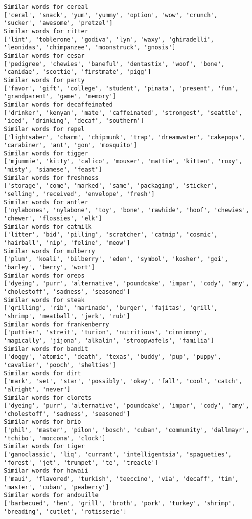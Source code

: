 \documentclass[11pt]{article}
\begin{document}
\begin{Verbatim}[commandchars=\\\{\}]
Similar words for cereal
['ceral', 'snack', 'yum', 'yummy', 'option', 'wow', 'crunch', 'sucker', 'awesome', 'pretzel']
Similar words for ritter
['lint', 'toblerone', 'godiva', 'lyn', 'waxy', 'ghiradelli', 'leonidas', 'chimpanzee', 'moonstruck', 'gnosis']
Similar words for cesar
['pedigree', 'chewies', 'baneful', 'dentastix', 'woof', 'bone', 'canidae', 'scottie', 'firstmate', 'pigg']
Similar words for party
['favor', 'gift', 'college', 'student', 'pinata', 'present', 'fun', 'grandparent', 'game', 'memory']
Similar words for decaffeinated
['drinker', 'kenyan', 'mate', 'caffeinated', 'strongest', 'seattle', 'iced', 'drinking', 'decaf', 'southern']
Similar words for repel
['lightsaber', 'charm', 'chipmunk', 'trap', 'dreamwater', 'cakepops', 'carabiner', 'ant', 'gon', 'mosquito']
Similar words for tigger
['mjummie', 'kitty', 'calico', 'mouser', 'mattie', 'kitten', 'roxy', 'misty', 'siamese', 'feast']
Similar words for freshness
['storage', 'come', 'marked', 'same', 'packaging', 'sticker', 'selling', 'received', 'envelope', 'fresh']
Similar words for antler
['nylabones', 'nylabone', 'toy', 'bone', 'rawhide', 'hoof', 'chewies', 'chewer', 'flossies', 'elk']
Similar words for catmilk
['litter', 'bid', 'pilling', 'scratcher', 'catnip', 'cosmic', 'hairball', 'nip', 'feline', 'meow']
Similar words for mulberry
['plum', 'koali', 'bilberry', 'eden', 'symbol', 'kosher', 'goi', 'barley', 'berry', 'wort']
Similar words for oreos
['dyeing', 'purr', 'alternative', 'poundcake', 'impar', 'cody', 'amy', 'cholestoff', 'sadness', 'seasoned']
Similar words for steak
['grilling', 'rib', 'marinade', 'burger', 'fajitas', 'grill', 'shrimp', 'meatball', 'jerk', 'rub']
Similar words for frankenberry
['puttier', 'streit', 'turion', 'nutritious', 'cinnimony', 'magically', 'jijona', 'alkalin', 'stroopwafels', 'familia']
Similar words for bandit
['doggy', 'atomic', 'death', 'texas', 'buddy', 'pup', 'puppy', 'cavalier', 'pooch', 'shelties']
Similar words for dirt
['mark', 'set', 'star', 'possibly', 'okay', 'fall', 'cool', 'catch', 'alright', 'never']
Similar words for clorets
['dyeing', 'purr', 'alternative', 'poundcake', 'impar', 'cody', 'amy', 'cholestoff', 'sadness', 'seasoned']
Similar words for brio
['phil', 'master', 'pilon', 'bosch', 'cuban', 'community', 'dallmayr', 'tchibo', 'moccona', 'clock']
Similar words for tiger
['ganoclassic', 'liq', 'currant', 'intelligentsia', 'spagueties', 'forest', 'jet', 'trumpet', 'te', 'treacle']
Similar words for hawaii
['maui', 'flavored', 'turkish', 'teeccino', 'via', 'decaff', 'tim', 'master', 'cuban', 'peaberry']
Similar words for andouille
['barbecued', 'hen', 'grill', 'broth', 'pork', 'turkey', 'shrimp', 'breading', 'cutlet', 'rotisserie']

\end{Verbatim}
\end{document}
